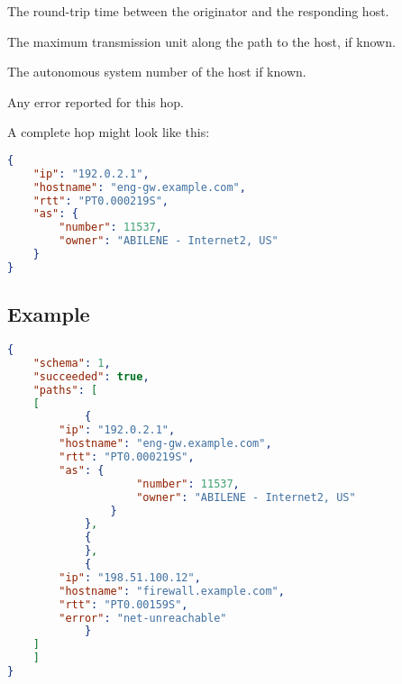 \documentclass[10pt]{article}
\begin{document}
 The round-trip time between the originator
and the responding host.

 The maximum transmission unit along the path
to the host, if known.

 The autonomous system number of the host if
known.

 Any error reported for this hop.

A complete hop might look like this:
\begin{lstlisting}[language=json]
{
    "ip": "192.0.2.1",
    "hostname": "eng-gw.example.com",
    "rtt": "PT0.000219S",
    "as": {
        "number": 11537,
        "owner": "ABILENE - Internet2, US"
    }
}
\end{lstlisting}



\subsection{Example}
\begin{lstlisting}[language=json]
{
    "schema": 1,
    "succeeded": true,
    "paths": [
	[
            {
		"ip": "192.0.2.1",
		"hostname": "eng-gw.example.com",
		"rtt": "PT0.000219S",
		"as": {
                    "number": 11537,
                    "owner": "ABILENE - Internet2, US"
                }
            },
            {
            },
            {
		"ip": "198.51.100.12",
		"hostname": "firewall.example.com",
		"rtt": "PT0.00159S",
		"error": "net-unreachable"
            }
	]
    ]
}
\end{lstlisting}
\end{document}
